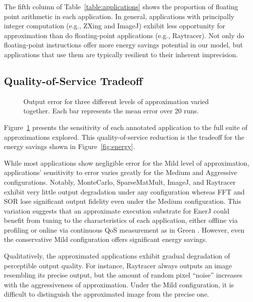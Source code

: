 The fifth column of Table~\ref{table:applications} shows the proportion of
floating point arithmetic in each application. In general, applications with
principally integer computation (e.g., ZXing and ImageJ) exhibit less
opportunity for approximation than do floating-point applications (e.g.,
Raytracer). Not only do floating-point instructions offer more energy savings
potential in our model, but applications that use them are typically resilient
to their inherent imprecision.

\subsection{Quality-of-Service Tradeoff}
\begin{figure}

\vspace{-4ex} %
\caption{Output error for three different levels of approximation varied
together. Each bar represents the mean error over 20 runs.}
\label{fig:sensitivity}
\end{figure}

Figure~\ref{fig:sensitivity} presents the sensitivity of each
annotated application to the full suite of approximations
explored. This quality-of-service reduction is the tradeoff for the
energy savings shown in Figure~\ref{fig:energy}.

While most applications show negligible error for the Mild level of
approximation, applications' sensitivity to error varies greatly for the Medium
and Aggressive configurations. Notably, MonteCarlo, SparseMatMult, ImageJ, and
Raytracer exhibit
very little output degradation under any configuration whereas FFT and SOR lose
significant output fidelity even under the Medium configuration.
This variation suggests that an approximate execution substrate for EnerJ
could benefit from tuning to the characteristics of each application,
either offline via profiling or online via continuous QoS measurement
as in Green \cite{green}.
However, even the
conservative Mild configuration offers significant energy savings.

Qualitatively, the approximated applications exhibit gradual degradation of
perceptible output quality. For instance, Raytracer always outputs an image
resembling its precise output, but the amount of random pixel ``noise''
increases with the aggressiveness of approximation. Under the Mild
configuration, it is difficult to distinguish the approximated image from the
precise one.

